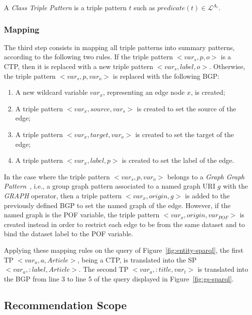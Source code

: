 \begin{definition} 
A \emph{Class Triple Pattern} is a triple pattern $t$ such as $predicate(t) \in \mathcal{L}^{A_c}$.
\label{def:class-triple-pattern}
\end{definition}

\subsubsection{Mapping}

The third step consists in mapping all triple patterns into summary patterns, according to the following two rules. If the triple pattern $<var_s, p, o>$ is a CTP, then it is replaced with a new triple pattern \mbox{$<var_s, label, o>$}. Otherwise, the triple pattern \mbox{$<var_s, p, var_o>$} is replaced with the following BGP:

\begin{enumerate}
    \item A new wildcard variable $var_x$, representing an edge node $x$, is created;
    \item A triple pattern $<var_x, source, var_s>$ is created to set the source of the edge;
    \item A triple pattern $<var_x, target, var_o>$ is created to set the target of the edge;
    \item A triple pattern $<var_x, label, p>$ is created to set the label of the edge.
\end{enumerate}

In the case where the triple pattern $<var_s, p, var_o>$ belongs to a \emph{Graph Graph Pattern}~\cite{PrudS08}, i.e., a group graph pattern associated to a named graph URI $g$ with the \emph{GRAPH} operator, then a triple pattern $<var_x, origin, g>$ is added to the previously defined BGP to set the named graph of the edge. However, if the named graph is the POF variable, the triple pattern $<var_x, origin, var_{POF}>$ is created instead in order to restrict each edge to be from the same dataset and to bind the dataset label to the POF variable.

Applying these mapping rules on the query of Figure~\ref{fig:entity-sparql}, the first TP \mbox{$<var_a, a, Article>$}, being a CTP, is translated into the SP \mbox{$<var_a, :label, Article>$}. The second TP \mbox{$<var_a, :title, var_t>$} is translated into the BGP from line 3 to line 5 of the query displayed in Figure~\ref{fig:gs-sparql}.

\subsection{Recommendation Scope}

